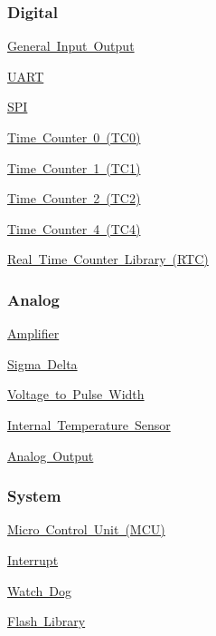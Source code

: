 \subsubsection*{Digital}


\begin{DoxyItemize}
\item \mbox{\hyperlink{a00144}{General Input Output}}
\item \mbox{\hyperlink{a00158}{U\+A\+RT}}
\item \mbox{\hyperlink{a00149}{S\+PI}}
\item \mbox{\hyperlink{a00153}{Time Counter 0 (T\+C0)}}
\item \mbox{\hyperlink{a00154}{Time Counter 1 (T\+C1)}}
\item \mbox{\hyperlink{a00155}{Time Counter 2 (T\+C2)}}
\item \mbox{\hyperlink{a00156}{Time Counter 4 (T\+C4)}}
\item \mbox{\hyperlink{a00157}{Real Time Counter Library (R\+TC)}}
\end{DoxyItemize}

\subsubsection*{Analog}


\begin{DoxyItemize}
\item \mbox{\hyperlink{a00146}{Amplifier}}
\item \mbox{\hyperlink{a00147}{Sigma Delta}}
\item \mbox{\hyperlink{a00159}{Voltage to Pulse Width}}
\item \mbox{\hyperlink{a00142}{Internal Temperature Sensor}}
\item \mbox{\hyperlink{a00139}{Analog Output}}
\end{DoxyItemize}

\subsubsection*{System}


\begin{DoxyItemize}
\item \mbox{\hyperlink{a00145}{Micro Control Unit (M\+CU)}}
\item \mbox{\hyperlink{a00143}{Interrupt}}
\item \mbox{\hyperlink{a00160}{Watch Dog}}
\item \mbox{\hyperlink{a00141}{Flash Library}}
\end{DoxyItemize}

